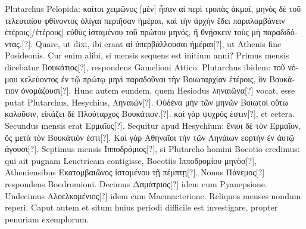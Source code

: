 Plutarchus Pelopida:
 \textgreek{καίτοι χειμῶνος [μὲν] ἦσαν αἱ περὶ τροπὰς
ἀκμαί, μηνὸς δὲ τοῦ τελευταίου φθίνοντος ὀλίγαι περιῆσαν ἡμέραι, καὶ
τὴν ἀρχὴν ἔδει παραλαμβάνειν ἑτέροις[/ἑτέρους] εὐθὺς ἱσταμένου τοῦ πρώτου μηνός,
 ἢ θνῄσκειν τοὺς μὴ παραδιδόντας.[?]}.
Quare, ut dixi, ibi erant \textgreek{αἱ ὑπερβάλλουσαι
ἡμέραι[?]}, ut Athenis fine Posideonis.
Cur enim alibi, si mensis sequens
est initium anni?
Primus mensis dicebatur \textgreek{Βουκάτιος[?]}, respondens
Gamelioni Attico.
Plutarchus ibidem: \textgreek{τοῦ νόμου κελεύοντος ἐν τῷ πρώτῳ
μηνὶ παραδοῦναι τὴν Bοιωταρχίαν ἑτέροις, ὃν Βουκάτιον ὀνομάζουσι[?]}.
Hunc
autem eundem, quem Hesiodus \textgreek{ληναιῶνα[?]} vocat,
 esse putat Plutarchus.
Hesychius, \textgreek{Ληναιών[?]}.
\textgreek{Οὐδένα μἠν τῶν μηνῶν Βοιωτοὶ οὕτω καλοῦσιν,
εἰκάζει δὲ Πλούταρχος Βουκάτιον.[?]}.
\textgreek{καὶ γὰρ ψυχρός ὲστιν[?]}, et cetera.
Secundus mensis
erat \textgreek{Ερμαῖος[?]}.
Sequitur apud Hesychium: \textgreek{ἔνιοι δὲ τὸν Ερμαῖον, ὅς
μετὰ τὸν Βουκάτιόν ἐστι[?]}.
\textgreek{Καὶ γὰρ Αθηναῖοι τὴν τῶν Ληνάιων εορτὴν ἐν ἀυτῷ άγουσι[?]}.
Septimus mensis \textgreek{Ιπποδρόμιος[?]},
 si Plutarcho homini Boeotio credimus:
qui ait pugnam Leuctricam contigisse, Boeotiis \textgreek{Ιπποδρομίου
μηνὸσ[?]}, Atheniensibus \textgreek{Εκατομβαιῶνος ἱσταμένου τῇ πέμπτῃ[?]}.
Nonus \textgreek{Πάνεμος[?]}
respondens Boedromioni.
Decimus \textgreek{Δαμἀτριος[?]} idem cum
Pyanepsione.
Undecimus \textgreek{Αλοελκομένιος[?]} idem cum Maemacterione.
Reliquos menses nondum reperi.
Caput autem et situm huius periodi
difficile est investigare, propter penuriam exemplorum.
